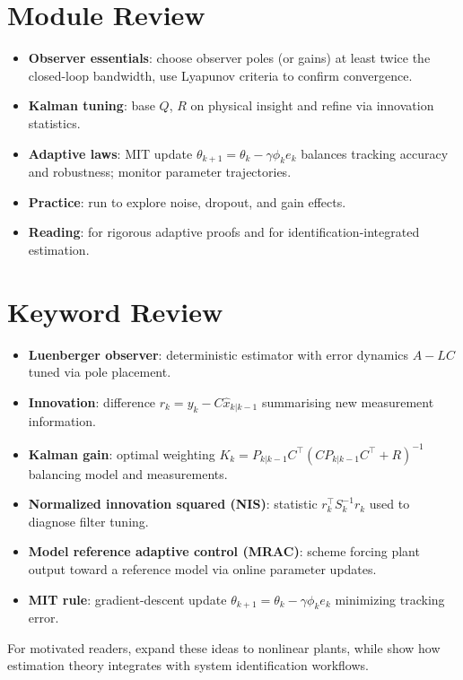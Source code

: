 \section{Module Review}
\begin{itemize}[leftmargin=*]
    \item \textbf{Observer essentials}: choose observer poles (or gains) at least twice the closed-loop bandwidth, use Lyapunov criteria to confirm convergence.
    \item \textbf{Kalman tuning}: base $Q$, $R$ on physical insight and refine via innovation statistics.
    \item \textbf{Adaptive laws}: MIT update $\theta_{k+1} = \theta_k - \gamma \phi_k e_k$ balances tracking accuracy and robustness; monitor parameter trajectories.
    \item \textbf{Practice}: run  to explore noise, dropout, and gain effects.
    \item \textbf{Reading}: \textcite{krstic1995nonlinear} for rigorous adaptive proofs and \textcite{ljung2012control} for identification-integrated estimation.
\end{itemize}

\section{Keyword Review}
\begin{vocabulary}
\begin{itemize}[leftmargin=*]
    \item \textbf{Luenberger observer}: deterministic estimator with error dynamics $A - L C$ tuned via pole placement.
    \item \textbf{Innovation}: difference $r_k = y_k - C \hat{x}_{k|k-1}$ summarising new measurement information.
    \item \textbf{Kalman gain}: optimal weighting $K_k = P_{k|k-1} C^\top (C P_{k|k-1} C^\top + R)^{-1}$ balancing model and measurements.
    \item \textbf{Normalized innovation squared (NIS)}: statistic $r_k^\top S_k^{-1} r_k$ used to diagnose filter tuning.
    \item \textbf{Model reference adaptive control (MRAC)}: scheme forcing plant output toward a reference model via online parameter updates.
    \item \textbf{MIT rule}: gradient-descent update $\theta_{k+1} = \theta_k - \gamma \phi_k e_k$ minimizing tracking error.
\end{itemize}
\end{vocabulary}

For motivated readers, \textcite{krstic1995nonlinear} expand these ideas to nonlinear plants, while \textcite{ljung2012control} show how estimation theory integrates with system identification workflows.
